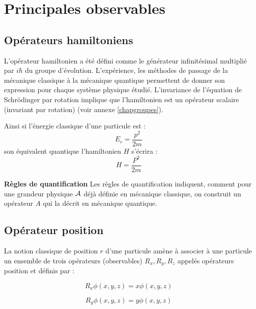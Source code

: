 \documentclass[12pt]{book}
\begin{document}
\section{Principales  observables}
\subsection{Op\'erateurs hamiltoniens}
L'op\'erateur hamiltonien  a \'et\'e
d\'efini comme le g\'en\'erateur 
infinit\'esimal multipli\'e par $i\hbar$ du groupe d'\'evolution.
L'exp\'erience, les m\'ethodes de passage de la m\'ecanique classique
\`a la m\'ecanique quantique permettent de donner son expression pour
chaque syst\`eme physique \'etudi\'e.
L'invariance de l'\'equation de Schr\"odinger par rotation implique que
l'hamiltonien est un op\'erateur scalaire (invariant par rotation)
(voir annexe \ref{chapgroupes}).
\begin{exmp}
Ainsi si l'\'energie classique d'une particule est :
\begin{equation}
E_c=\frac{p^2}{2m}
\end{equation}
son \'equivalent quantique l'hamiltonien $H$ s'\'ecrira :
\begin{equation}
H=\frac{P^2}{2m}
\end{equation}
\end{exmp}
\begin{rem}{\bf R\`egles de quantification}
Les r\`egles de quantification \cite{ph:mecaq:Cohen73} indiquent, comment pour
une grandeur physique ${\cal A}$ d\'ej\`a d\'efinie en m\'ecanique
classique, on construit un op\'erateur $A$ qui la d\'ecrit en
m\'ecanique quantique. 
\end{rem}
\subsection{Op\'erateur position}

La notion classique de position $r$ d'une particule am\`ene \`a
associer \`a une particule un ensemble de trois op\'erateurs (observables)
$R_x,R_y,R_z$ appel\'es op\'erateurs position et d\'efinis par :

\begin{equation}
R_x\phi(x,y,z)=x\phi(x,y,z)
\end{equation}

\begin{equation}
R_y\phi(x,y,z)=y\phi(x,y,z)
\end{equation}
\end{document}

